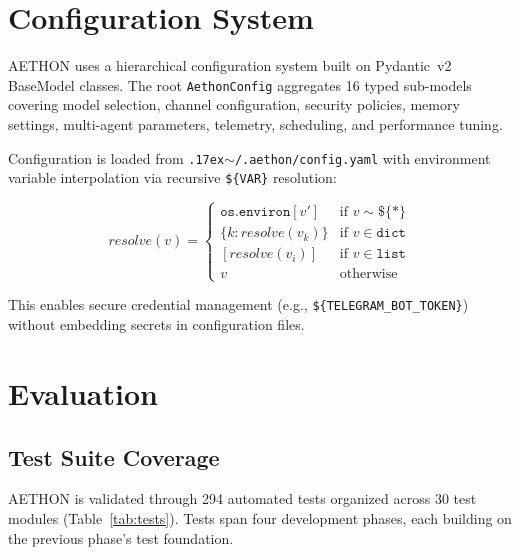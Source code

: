 \documentclass[9pt,twocolumn,letterpaper]{extarticle}
\begin{document}
\section{Configuration System}
\label{sec:config}

AETHON uses a hierarchical configuration system built on Pydantic~v2 BaseModel classes.
The root \texttt{AethonConfig} aggregates 16 typed sub-models covering model selection, channel configuration, security policies, memory settings, multi-agent parameters, telemetry, scheduling, and performance tuning.

Configuration is loaded from \texttt{\raise.17ex\hbox{$\scriptstyle\sim$}/.aethon/config.yaml} with environment variable interpolation via recursive \texttt{\$\{VAR\}} resolution:

\begin{equation}
\textit{resolve}(v) = \begin{cases}
\texttt{os.environ}[v'] & \text{if } v \sim \texttt{\$\{*\}} \\
\{k: \textit{resolve}(v_k)\} & \text{if } v \in \texttt{dict} \\
[\textit{resolve}(v_i)] & \text{if } v \in \texttt{list} \\
v & \text{otherwise}
\end{cases}
\end{equation}

\noindent This enables secure credential management (e.g., \texttt{\$\{TELEGRAM\_BOT\_TOKEN\}}) without embedding secrets in configuration files.

\section{Evaluation}
\label{sec:eval}

\subsection{Test Suite Coverage}

AETHON is validated through 294 automated tests organized across 30 test modules (Table~\ref{tab:tests}).
Tests span four development phases, each building on the previous phase's test foundation.
\end{document}
